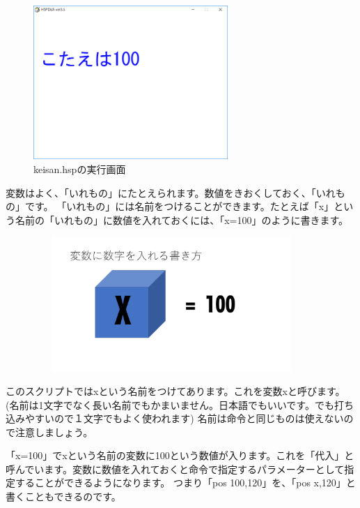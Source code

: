 \begin{figure}[H]
    \begin{center}
        \includegraphics[keepaspectratio,width=7.382cm,height=5.831cm]{text02-img/text02-img044.png}
        \caption{keisan.hspの実行画面}
    \end{center}
\end{figure}

変数はよく、「いれもの」にたとえられます。数値をきおくしておく、「いれもの」です。
「いれもの」には名前をつけることができます。たとえば「x」という名前の「いれもの」に数値を入れておくには、「x=100」のように書きます。

\begin{figure}[H]
    \begin{center}
        \includegraphics[keepaspectratio,width=10.478cm,height=5.106cm]{text02-img/text02-img045.png}
    \end{center}
\end{figure}

このスクリプトではxという名前をつけてあります。これを変数xと呼びます。(名前は1文字でなく長い名前でもかまいません。日本語でもいいです。でも打ち込みやすいので１文字でもよく使われます)
名前は命令と同じものは使えないので注意しましょう。

「x=100」でxという名前の変数に100という数値が入ります。これを「代入」と呼んでいます。変数に数値を入れておくと命令で指定するパラメーターとして指定することができるようになります。
つまり「pos 100,120」を、「pos x,120」と書くこともできるのです。

